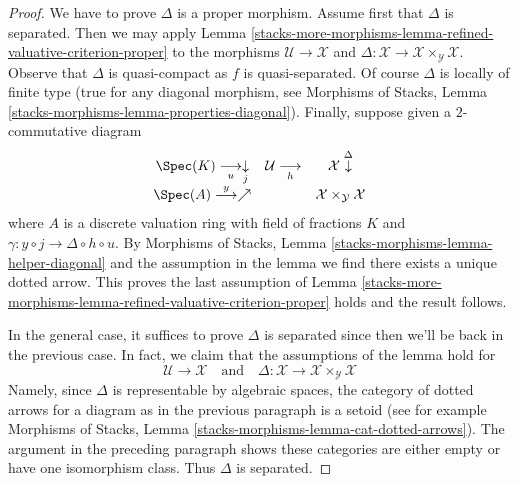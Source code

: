\begin{proof}
We have to prove $\Delta$ is a proper morphism.
Assume first that $\Delta$ is separated. Then we may apply
Lemma \ref{stacks-more-morphisms-lemma-refined-valuative-criterion-proper}
to the morphisms $\mathcal{U} \to \mathcal{X}$ and
$\Delta : \mathcal{X} \to \mathcal{X} \times_\mathcal{Y} \mathcal{X}$.
Observe that $\Delta$ is quasi-compact as $f$ is quasi-separated.
Of course $\Delta$ is locally of finite type (true for any
diagonal morphism, see Morphisms of Stacks, Lemma
\ref{stacks-morphisms-lemma-properties-diagonal}).
Finally, suppose given a $2$-commutative diagram
$$
\begin{array}{ccc}\Spec(K) \underset{u}{\longrightarrow}\underset{j}{\downarrow} & \mathcal{U} \underset{h}{\longrightarrow} & \mathcal{X} \overset{\Delta}{\downarrow} \\ \Spec(A) \overset{y}{\longrightarrow}\nearrow &  & \mathcal{X} \times_\mathcal{Y} \mathcal{X}\end{array}
$$
where $A$ is a discrete valuation ring with field of fractions $K$
and $\gamma : y \circ j \to \Delta \circ h \circ u$.
By Morphisms of Stacks, Lemma \ref{stacks-morphisms-lemma-helper-diagonal}
and the assumption in the lemma
we find there exists a unique dotted arrow.
This proves the last assumption of
Lemma \ref{stacks-more-morphisms-lemma-refined-valuative-criterion-proper}
holds and the result follows.

\medskip\noindent
In the general case, it suffices to prove $\Delta$ is separated
since then we'll be back in the previous case. In fact, we claim
that the assumptions of the lemma hold for
$$
\mathcal{U} \to \mathcal{X}
\quad\text{and}\quad
\Delta :
\mathcal{X} \to
\mathcal{X} \times_\mathcal{Y} \mathcal{X}
$$
Namely, since $\Delta$ is representable by algebraic spaces, the
category of dotted arrows for a diagram as in the previous paragraph
is a setoid (see for example
Morphisms of Stacks, Lemma \ref{stacks-morphisms-lemma-cat-dotted-arrows}).
The argument in the preceding paragraph shows these categories
are either empty or have one isomorphism class.
Thus $\Delta$ is separated.
\end{proof}

